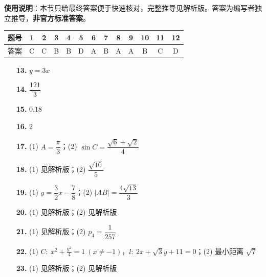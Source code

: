 
\begin{gknotice}
\textbf{使用说明}：本节只给最终答案便于快速核对，完整推导见解析版。答案为编写者独立推导，\textbf{非官方标准答案}。
\end{gknotice}

\begin{center}\begin{tabular}{ccccccccccccc}
\toprule
题号 & 1 & 2 & 3 & 4 & 5 & 6 & 7 & 8 & 9 & 10 & 11 & 12 \\
\midrule
答案 & C & C & B & B & D & A & B & A & A & B & C & D \\
\bottomrule
\end{tabular}\end{center}

\begin{itemize}[leftmargin=2.6em]
  \item[\textbf{13.}] $y=3x$
  \item[\textbf{14.}] $\dfrac{121}3$
  \item[\textbf{15.}] $0.18$
  \item[\textbf{16.}] $2$
\end{itemize}

\begin{itemize}[leftmargin=2.6em]
  \item[\textbf{17.}] (1) $A=\dfrac\pi3$；(2) $\sin C=\dfrac{\sqrt6+\sqrt2}4$
  \item[\textbf{18.}] (1) 见解析版；(2) $\dfrac{\sqrt{10}}5$
  \item[\textbf{19.}] (1) $y=\dfrac32x-\dfrac78$；(2) $|AB|=\dfrac{4\sqrt{13}}3$
  \item[\textbf{20.}] (1) 见解析版；(2) 见解析版
  \item[\textbf{21.}] (1) 见解析版；(2) $p_4=\dfrac1{257}$
\end{itemize}

\begin{itemize}[leftmargin=2.6em]
  \item[\textbf{22.}] (1) $C:\ x^{2}+\frac{y^{2}}4=1\ (x\ne-1)$，$l:\ 2x+\sqrt3y+11=0$；(2) 最小距离 $\sqrt7$
  \item[\textbf{23.}] (1) 见解析版；(2) 见解析版
\end{itemize}
